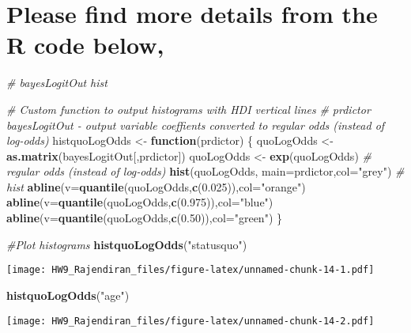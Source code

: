 \documentclass[]{article}
\newenvironment{Shaded}{\begin{snugshade}}{\end{snugshade}}
\newcommand{\CommentTok}[1]{\textcolor[rgb]{0.56,0.35,0.01}{\textit{#1}}}
\newcommand{\ControlFlowTok}[1]{\textcolor[rgb]{0.13,0.29,0.53}{\textbf{#1}}}
\newcommand{\DataTypeTok}[1]{\textcolor[rgb]{0.13,0.29,0.53}{#1}}
\newcommand{\FloatTok}[1]{\textcolor[rgb]{0.00,0.00,0.81}{#1}}
\newcommand{\KeywordTok}[1]{\textcolor[rgb]{0.13,0.29,0.53}{\textbf{#1}}}
\newcommand{\NormalTok}[1]{#1}
\newcommand{\StringTok}[1]{\textcolor[rgb]{0.31,0.60,0.02}{#1}}
\begin{document}
\hypertarget{please-find-more-details-from-the-r-code-below-3}{%
\section{Please find more details from the R code
below,}\label{please-find-more-details-from-the-r-code-below-3}}

\begin{Shaded}
\begin{Highlighting}[]
\CommentTok{# bayesLogitOut hist }

\CommentTok{# Custom function to output histograms with HDI vertical lines }
\CommentTok{# prdictor bayesLogitOut - output variable coeffients converted to regular odds (instead of log-odds)}
\NormalTok{histquoLogOdds <-}\StringTok{ }\ControlFlowTok{function}\NormalTok{(prdictor)}
\NormalTok{  \{}
\NormalTok{  quoLogOdds <-}\StringTok{ }\KeywordTok{as.matrix}\NormalTok{(bayesLogitOut[,prdictor])}
\NormalTok{  quoLogOdds <-}\StringTok{ }\KeywordTok{exp}\NormalTok{(quoLogOdds)  }\CommentTok{# regular odds (instead of log‐odds)}
  \KeywordTok{hist}\NormalTok{(quoLogOdds, }\DataTypeTok{main=}\NormalTok{prdictor,}\DataTypeTok{col=}\StringTok{"grey"}\NormalTok{) }\CommentTok{# hist}
  \KeywordTok{abline}\NormalTok{(}\DataTypeTok{v=}\KeywordTok{quantile}\NormalTok{(quoLogOdds,}\KeywordTok{c}\NormalTok{(}\FloatTok{0.025}\NormalTok{)),}\DataTypeTok{col=}\StringTok{"orange"}\NormalTok{) }
  \KeywordTok{abline}\NormalTok{(}\DataTypeTok{v=}\KeywordTok{quantile}\NormalTok{(quoLogOdds,}\KeywordTok{c}\NormalTok{(}\FloatTok{0.975}\NormalTok{)),}\DataTypeTok{col=}\StringTok{"blue"}\NormalTok{) }
  \KeywordTok{abline}\NormalTok{(}\DataTypeTok{v=}\KeywordTok{quantile}\NormalTok{(quoLogOdds,}\KeywordTok{c}\NormalTok{(}\FloatTok{0.50}\NormalTok{)),}\DataTypeTok{col=}\StringTok{"green"}\NormalTok{) }
\NormalTok{  \}}

\CommentTok{#Plot histograms}
\KeywordTok{histquoLogOdds}\NormalTok{(}\StringTok{"statusquo"}\NormalTok{) }
\end{Highlighting}
\end{Shaded}

\texttt{[image: HW9\_Rajendiran\_files/figure-latex/unnamed-chunk-14-1.pdf]}

\begin{Shaded}
\begin{Highlighting}[]
\KeywordTok{histquoLogOdds}\NormalTok{(}\StringTok{"age"}\NormalTok{) }
\end{Highlighting}
\end{Shaded}

\texttt{[image: HW9\_Rajendiran\_files/figure-latex/unnamed-chunk-14-2.pdf]}
\end{document}
